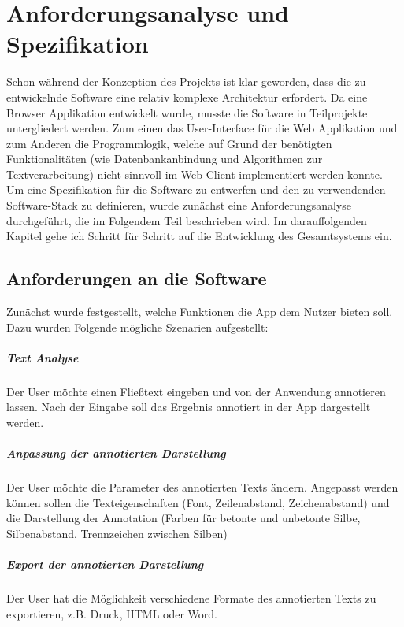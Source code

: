 
\chapter{Anforderungsanalyse und Spezifikation}

Schon während der Konzeption des Projekts ist klar geworden, dass die zu entwickelnde Software eine relativ komplexe Architektur erfordert. Da eine Browser Applikation entwickelt wurde, musste die Software in Teilprojekte untergliedert werden. Zum einen das User-Interface für die Web Applikation und zum Anderen die Programmlogik, welche auf Grund der benötigten Funktionalitäten (wie Datenbankanbindung und Algorithmen zur Textverarbeitung) nicht sinnvoll im Web Client implementiert werden konnte.\\
Um eine Spezifikation für die Software zu entwerfen und den zu verwendenden Software-Stack zu definieren, wurde zunächst eine Anforderungsanalyse durchgeführt, die im Folgendem Teil beschrieben wird. Im darauffolgenden Kapitel gehe ich Schritt für Schritt auf die Entwicklung des Gesamtsystems ein.

\section{Anforderungen an die Software}

Zunächst wurde festgestellt, welche Funktionen die App dem Nutzer bieten soll. Dazu wurden Folgende mögliche Szenarien aufgestellt:

\paragraph{Text Analyse} 
Der User möchte einen Fließtext eingeben und von der Anwendung annotieren lassen. Nach der Eingabe soll das Ergebnis annotiert in der App dargestellt werden.

\paragraph{Anpassung der annotierten Darstellung}
Der User möchte die Parameter des annotierten Texts ändern. Angepasst werden können sollen die Texteigenschaften (Font, Zeilenabstand, Zeichenabstand) und die Darstellung der Annotation (Farben für betonte und unbetonte Silbe, Silbenabstand, Trennzeichen zwischen Silben)

\paragraph{Export der annotierten Darstellung}
Der User hat die Möglichkeit verschiedene Formate des annotierten Texts zu exportieren, z.B. Druck, HTML oder Word.

